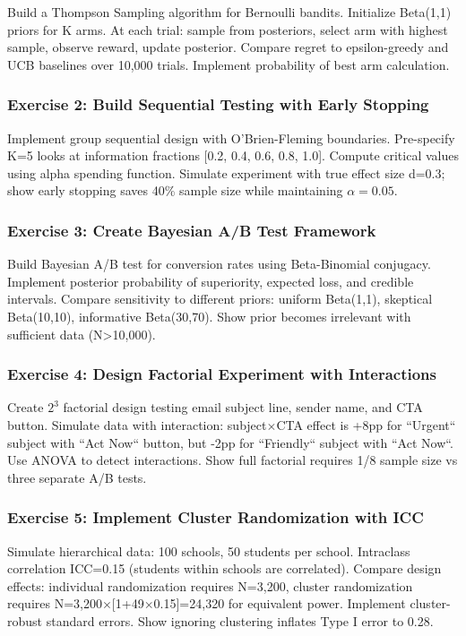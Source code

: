 Build a Thompson Sampling algorithm for Bernoulli bandits. Initialize Beta(1,1) priors for K arms. At each trial: sample from posteriors, select arm with highest sample, observe reward, update posterior. Compare regret to epsilon-greedy and UCB baselines over 10,000 trials. Implement probability of best arm calculation.

\subsubsection{Exercise 2: Build Sequential Testing with Early Stopping}

Implement group sequential design with O'Brien-Fleming boundaries. Pre-specify K=5 looks at information fractions [0.2, 0.4, 0.6, 0.8, 1.0]. Compute critical values using alpha spending function. Simulate experiment with true effect size d=0.3; show early stopping saves 40\% sample size while maintaining $\alpha=0.05$.

\subsubsection{Exercise 3: Create Bayesian A/B Test Framework}

Build Bayesian A/B test for conversion rates using Beta-Binomial conjugacy. Implement posterior probability of superiority, expected loss, and credible intervals. Compare sensitivity to different priors: uniform Beta(1,1), skeptical Beta(10,10), informative Beta(30,70). Show prior becomes irrelevant with sufficient data (N>10,000).

\subsubsection{Exercise 4: Design Factorial Experiment with Interactions}

Create $2^3$ factorial design testing email subject line, sender name, and CTA button. Simulate data with interaction: subject$\times$CTA effect is +8pp for ``Urgent`` subject with ``Act Now`` button, but -2pp for ``Friendly`` subject with ``Act Now``. Use ANOVA to detect interactions. Show full factorial requires 1/8 sample size vs three separate A/B tests.

\subsubsection{Exercise 5: Implement Cluster Randomization with ICC}

Simulate hierarchical data: 100 schools, 50 students per school. Intraclass correlation ICC=0.15 (students within schools are correlated). Compare design effects: individual randomization requires N=3,200, cluster randomization requires N=3,200$\times$[1+49$\times$0.15]=24,320 for equivalent power. Implement cluster-robust standard errors. Show ignoring clustering inflates Type I error to 0.28.

